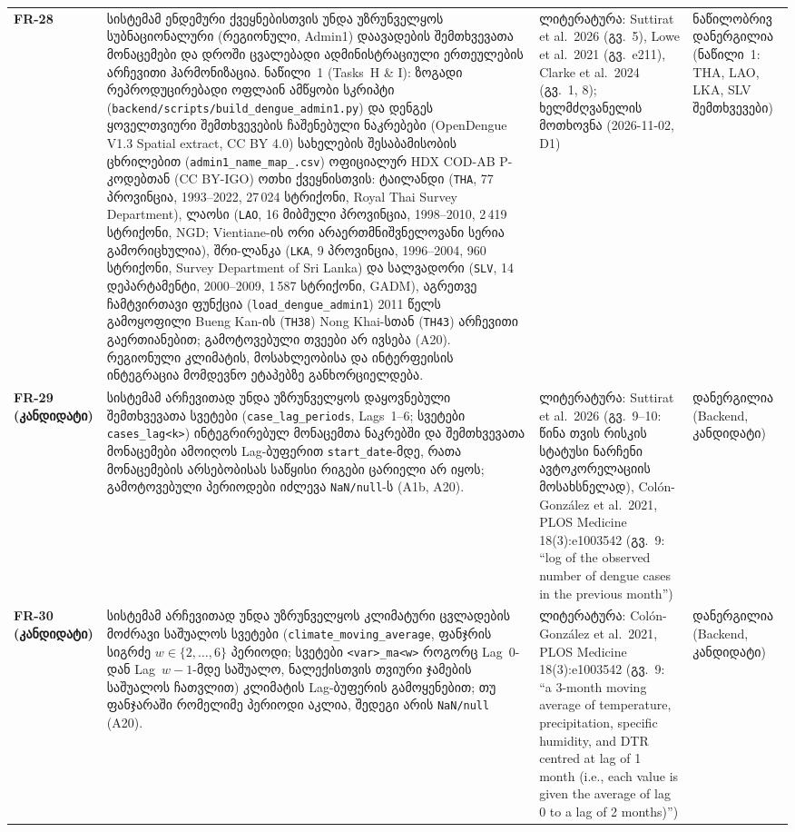 \documentclass[11pt,a4paper]{article}
\begin{document}
\begin{longtable}{@{}>{\bfseries}p{1.6cm} L{7.4cm} L{3.6cm} L{2.4cm}@{}}
FR-28 & სისტემამ ენდემური ქვეყნებისთვის უნდა უზრუნველყოს სუბნაციონალური (რეგიონული, Admin1) დაავადების შემთხვევათა მონაცემები და დროში ცვალებადი ადმინისტრაციული ერთეულების არჩევითი ჰარმონიზაცია. ნაწილი~1 (Tasks~H \& I): ზოგადი რეპროდუცირებადი ოფლაინ ამწყობი სკრიპტი (\texttt{backend/scripts/build\_dengue\_admin1.py}) და დენგეს ყოველთვიური შემთხვევების ჩაშენებული ნაკრებები (OpenDengue V1.3 Spatial extract, CC BY 4.0) სახელების შესაბამისობის ცხრილებით (\texttt{admin1\_name\_map\_<ISO3>.csv}) ოფიციალურ HDX COD-AB P-კოდებთან (CC BY-IGO) ოთხი ქვეყნისთვის: ტაილანდი (\texttt{THA}, 77 პროვინცია, 1993--2022, 27\,024 სტრიქონი, Royal Thai Survey Department), ლაოსი (\texttt{LAO}, 16 მიბმული პროვინცია, 1998--2010, 2\,419 სტრიქონი, NGD; Vientiane-ის ორი არაერთმნიშვნელოვანი სერია გამორიცხულია), შრი-ლანკა (\texttt{LKA}, 9 პროვინცია, 1996--2004, 960 სტრიქონი, Survey Department of Sri Lanka) და სალვადორი (\texttt{SLV}, 14 დეპარტამენტი, 2000--2009, 1\,587 სტრიქონი, GADM), აგრეთვე ჩამტვირთავი ფუნქცია (\texttt{load\_dengue\_admin1}) 2011 წელს გამოყოფილი Bueng Kan-ის (\texttt{TH38}) Nong Khai-სთან (\texttt{TH43}) არჩევითი გაერთიანებით; გამოტოვებული თვეები არ ივსება (A20). რეგიონული კლიმატის, მოსახლეობისა და ინტერფეისის ინტეგრაცია მომდევნო ეტაპებზე განხორციელდება. & ლიტერატურა: Suttirat et al.\ 2026 (გვ.~5), Lowe et al.\ 2021 (გვ.~e211), Clarke et al.\ 2024 (გვ.~1, 8); ხელმძღვანელის მოთხოვნა (2026-11-02, D1) & ნაწილობრივ დანერგილია (ნაწილი~1: THA, LAO, LKA, SLV შემთხვევები) \\
FR-29 (კანდიდატი) & სისტემამ არჩევითად უნდა უზრუნველყოს დაყოვნებული შემთხვევათა სვეტები (\texttt{case\_lag\_periods}, Lags~1--6; სვეტები \texttt{cases\_lag<k>}) ინტეგრირებულ მონაცემთა ნაკრებში და შემთხვევათა მონაცემები ამოიღოს Lag-ბუფერით \texttt{start\_date}-მდე, რათა მონაცემების არსებობისას საწყისი რიგები ცარიელი არ იყოს; გამოტოვებული პერიოდები იძლევა \texttt{NaN/null}-ს (A1b, A20). & ლიტერატურა: Suttirat et al.\ 2026 (გვ.~9--10: წინა თვის რისკის სტატუსი ნარჩენი ავტოკორელაციის მოსახსნელად), Col\'on-Gonz\'alez et al.\ 2021, PLOS Medicine 18(3):e1003542 (გვ.~9: ``log of the observed number of dengue cases in the previous month'') & დანერგილია (Backend, კანდიდატი) \\
FR-30 (კანდიდატი) & სისტემამ არჩევითად უნდა უზრუნველყოს კლიმატური ცვლადების მოძრავი საშუალოს სვეტები (\texttt{climate\_moving\_average}, ფანჯრის სიგრძე $w \in \{2,\dots,6\}$ პერიოდი; სვეტები \texttt{<var>\_ma<w>} როგორც Lag~0-დან Lag~$w-1$-მდე საშუალო, ნალექისთვის თვიური ჯამების საშუალოს ჩათვლით) კლიმატის Lag-ბუფერის გამოყენებით; თუ ფანჯარაში რომელიმე პერიოდი აკლია, შედეგი არის \texttt{NaN/null} (A20). & ლიტერატურა: Col\'on-Gonz\'alez et al.\ 2021, PLOS Medicine 18(3):e1003542 (გვ.~9: ``a 3-month moving average of temperature, precipitation, specific humidity, and DTR centred at lag of 1 month (i.e., each value is given the average of lag 0 to a lag of 2 months)'') & დანერგილია (Backend, კანდიდატი) \\
\bottomrule
\end{longtable}
\end{document}
